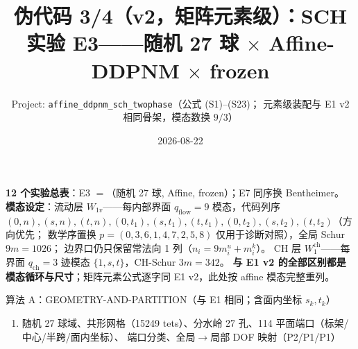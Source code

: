 \documentclass[11pt]{article}
\title{\bfseries 伪代码 3/4（v2，矩阵元素级）：SCH 实验 E3——随机 27 球 $\times$ Affine-DDPNM $\times$ frozen}
\author{Project: \texttt{affine\_ddpnm\_sch\_twophase}（公式 (S1)--(S23)；
元素级装配与 E1 v2 相同骨架，模态数换 $9/3$）}
\date{2026-08-22}
\newenvironment{pseudo}[1]{\begin{algobox}{#1}%
  \begin{enumerate}[label={\ttfamily\arabic*}, leftmargin=3.4em, itemsep=1.5pt, topsep=1pt, parsep=0pt]}%
  {\end{enumerate}\end{algobox}}
\begin{document}
\maketitle

\noindent\textbf{12 个实验总表}：E3 $=$（随机 27 球, Affine, frozen）；E7 同序换 Bentheimer。
\textbf{模态设定}：流动层 $W_{1v}$——每内部界面 $q_{\mathrm{flow}}=9$ 模态，代码列序
$(0,n),(s,n),(t,n),(0,t_1),(s,t_1),(t,t_1),(0,t_2),(s,t_2),(t,t_2)$（方向优先；
数学序置换 $p=(0,3,6,1,4,7,2,5,8)$ 仅用于诊断对照），全局 Schur $9m=1026$；
边界口仍只保留常法向 1 列（$n_i=9m_i^u+m_i^k$）。
CH 层 $W^{\mathrm{ch}}_1$——每界面 $q_{\mathrm{ch}}=3$ 迹模态 $\{1,s,t\}$，CH-Schur $3m=342$。
\textbf{与 E1 v2 的全部区别都是模态循环与尺寸}；矩阵元素公式逐字同 E1 v2，此处按 affine 模态完整重列。

\begin{pseudo}{算法 A：GEOMETRY-AND-PARTITION（与 E1 相同；含面内坐标 $s_k,t_k$）}
\item 随机 27 球域、共形网格（15249 tets）、分水岭 27 孔、114 平面端口（标架/中心/半跨/面内坐标）、
端口分类、全局$\to$局部 DOF 映射（P2/P1/P1）
\end{pseudo}
\end{document}
